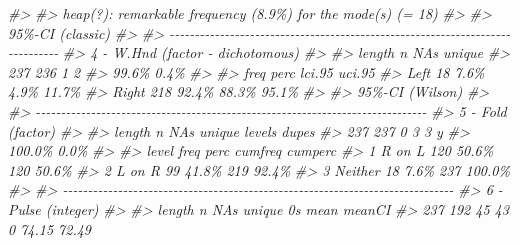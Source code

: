 \documentclass[
]{book}
\newenvironment{Shaded}{\begin{snugshade}}{\end{snugshade}}
\newcommand{\CommentTok}[1]{\textcolor[rgb]{0.56,0.35,0.01}{\textit{#1}}}
\begin{document}
\begin{Shaded}
\begin{Highlighting}[]
\CommentTok{\#\textgreater{} }
\CommentTok{\#\textgreater{} heap(?): remarkable frequency (8.9\%) for the mode(s) (= 18)}
\CommentTok{\#\textgreater{} }
\CommentTok{\#\textgreater{} \textquotesingle{} 95\%{-}CI (classic)}
\CommentTok{\#\textgreater{} }
\CommentTok{\#\textgreater{} {-}{-}{-}{-}{-}{-}{-}{-}{-}{-}{-}{-}{-}{-}{-}{-}{-}{-}{-}{-}{-}{-}{-}{-}{-}{-}{-}{-}{-}{-}{-}{-}{-}{-}{-}{-}{-}{-}{-}{-}{-}{-}{-}{-}{-}{-}{-}{-}{-}{-}{-}{-}{-}{-}{-}{-}{-}{-}{-}{-}{-}{-}{-}{-}{-}{-}{-}{-}{-}{-}{-}{-}{-}{-}{-}{-}{-}{-} }
\CommentTok{\#\textgreater{} 4 {-} W.Hnd (factor {-} dichotomous)}
\CommentTok{\#\textgreater{} }
\CommentTok{\#\textgreater{}   length      n    NAs unique}
\CommentTok{\#\textgreater{}      237    236      1      2}
\CommentTok{\#\textgreater{}           99.6\%   0.4\%       }
\CommentTok{\#\textgreater{} }
\CommentTok{\#\textgreater{}        freq   perc  lci.95  uci.95\textquotesingle{}}
\CommentTok{\#\textgreater{} Left     18   7.6\%    4.9\%   11.7\%}
\CommentTok{\#\textgreater{} Right   218  92.4\%   88.3\%   95.1\%}
\CommentTok{\#\textgreater{} }
\CommentTok{\#\textgreater{} \textquotesingle{} 95\%{-}CI (Wilson)}
\CommentTok{\#\textgreater{} }
\CommentTok{\#\textgreater{} {-}{-}{-}{-}{-}{-}{-}{-}{-}{-}{-}{-}{-}{-}{-}{-}{-}{-}{-}{-}{-}{-}{-}{-}{-}{-}{-}{-}{-}{-}{-}{-}{-}{-}{-}{-}{-}{-}{-}{-}{-}{-}{-}{-}{-}{-}{-}{-}{-}{-}{-}{-}{-}{-}{-}{-}{-}{-}{-}{-}{-}{-}{-}{-}{-}{-}{-}{-}{-}{-}{-}{-}{-}{-}{-}{-}{-}{-} }
\CommentTok{\#\textgreater{} 5 {-} Fold (factor)}
\CommentTok{\#\textgreater{} }
\CommentTok{\#\textgreater{}   length      n    NAs unique levels  dupes}
\CommentTok{\#\textgreater{}      237    237      0      3      3      y}
\CommentTok{\#\textgreater{}          100.0\%   0.0\%                     }
\CommentTok{\#\textgreater{} }
\CommentTok{\#\textgreater{}      level  freq   perc  cumfreq  cumperc}
\CommentTok{\#\textgreater{} 1   R on L   120  50.6\%      120    50.6\%}
\CommentTok{\#\textgreater{} 2   L on R    99  41.8\%      219    92.4\%}
\CommentTok{\#\textgreater{} 3  Neither    18   7.6\%      237   100.0\%}
\CommentTok{\#\textgreater{} }
\CommentTok{\#\textgreater{} {-}{-}{-}{-}{-}{-}{-}{-}{-}{-}{-}{-}{-}{-}{-}{-}{-}{-}{-}{-}{-}{-}{-}{-}{-}{-}{-}{-}{-}{-}{-}{-}{-}{-}{-}{-}{-}{-}{-}{-}{-}{-}{-}{-}{-}{-}{-}{-}{-}{-}{-}{-}{-}{-}{-}{-}{-}{-}{-}{-}{-}{-}{-}{-}{-}{-}{-}{-}{-}{-}{-}{-}{-}{-}{-}{-}{-}{-} }
\CommentTok{\#\textgreater{} 6 {-} Pulse (integer)}
\CommentTok{\#\textgreater{} }
\CommentTok{\#\textgreater{}   length      n    NAs  unique     0s   mean  meanCI\textquotesingle{}}
\CommentTok{\#\textgreater{}      237    192     45      43      0  74.15   72.49}

\end{Highlighting}
\end{Shaded}
\end{document}
